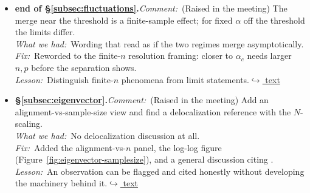 \documentclass[12pt]{article}
\newcommand{\gdlogentry}[6]{%
  \item[\textcolor{thesisRev}{$\star$\,\ref{gdrev:#1}}]\hypertarget{gdlog:#1}{}%
  \textbf{#2.}\enspace\emph{Comment:}~#3\\
  \emph{What we had:}~#4\\
  \emph{Fix:}~#5\\
  \emph{Lesson:}~#6\enspace\hyperlink{gdtext:#1}{\textcolor{thesisLink}{$\hookrightarrow$ text}}}
\begin{document}
\begin{itemize}[leftmargin=2.4em,itemsep=0.55em]
\gdlogentry{critical-finite-n}{end of \S\ref{subsec:fluctuations}}{(Raised in the meeting) The merge near the threshold is a finite-sample effect; for fixed \(\alpha\) off the threshold the limits differ.}{Wording that read as if the two regimes merge asymptotically.}{Reworded to the finite-\(n\) resolution framing: closer to \(\alpha_c\) needs larger \(n, p\) before the separation shows.}{Distinguish finite-\(n\) phenomena from limit statements.}

\gdlogentry{delocalization}{\S\ref{subsec:eigenvector}}{(Raised in the meeting) Add an alignment-vs-sample-size view and find a delocalization reference with the \(N\)-scaling.}{No delocalization discussion at all.}{Added the alignment-vs-\(n\) panel, the log-log figure (Figure~\ref{fig:eigenvector-samplesize}), and a general discussion citing \citet{BloemendalKnowlesYauYin2016}.}{An observation can be flagged and cited honestly without developing the machinery behind it.}
\end{itemize}
\end{document}
